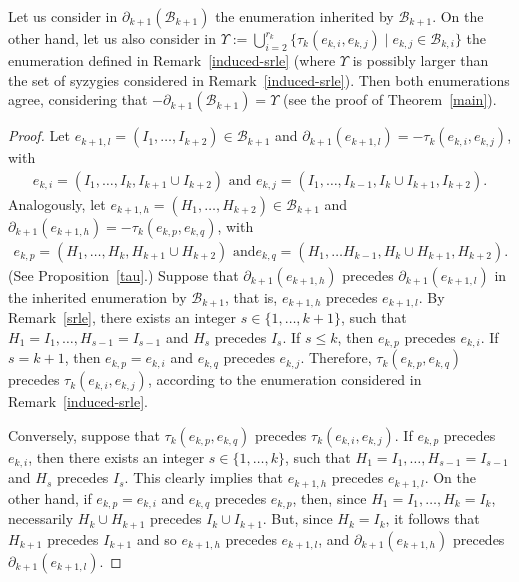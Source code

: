 \documentclass[ALCO]{cedram}
\newcommand{\mcb}{\mbox{$\mathcal{B}$}}
\newcommand{\dif}{\mbox{$\partial$}}
\begin{document}
\begin{remark}\label{enum}
Let us consider in $\dif_{k+1}(\mcb_{k+1})$ the enumeration inherited
by $\mcb_{k+1}$. On the other hand, let us also consider in
$\Upsilon:=\bigcup_{i=2}^{r_k}\{\tau_{k}(e_{k,i},e_{k,j})\mid
e_{k,j}\in\mcb_{k,i}\}$ the enumeration defined in
Remark~\ref{induced-srle} (where $\Upsilon$ is possibly larger than
the set of syzygies considered in Remark~\ref{induced-srle}). Then
both enumerations agree, considering that
$-\dif_{k+1}(\mcb_{k+1})=\Upsilon$ (see the proof of
Theorem~\ref{main}).
\end{remark}
\begin{proof}
Let $e_{k+1,l}=(I_1,\ldots ,I_{k+2})\in\mcb_{k+1}$ and
$\dif_{k+1}(e_{k+1,l})= -\tau_{k}(e_{k,i},e_{k,j})$, with
\begin{eqnarray*}
e_{k,i}=(I_1,\ldots ,I_{k},I_{k+1}\cup I_{k+2})\mbox{ and }
e_{k,j}=(I_1,\ldots ,I_{k-1},I_k\cup I_{k+1},I_{k+2}).
\end{eqnarray*}
Analogously, let $e_{k+1,h}=(H_1,\ldots ,H_{k+2})\in\mcb_{k+1}$ and
$\dif_{k+1}(e_{k+1,h})=-\tau_{k}(e_{k,p},e_{k,q})$, with
\begin{eqnarray*}
e_{k,p}=(H_1,\ldots ,H_k,H_{k+1}\cup H_{k+2})\mbox{ and
}e_{k,q}=(H_1,\ldots H_{k-1},H_k\cup H_{k+1},H_{k+2}).
\end{eqnarray*}
(See Proposition~\ref{tau}.) Suppose that $\dif_{k+1}(e_{k+1,h})$
precedes $\dif_{k+1}(e_{k+1,l})$ in the inherited enumeration by
$\mcb_{k+1}$, that is, $e_{k+1,h}$ precedes $e_{k+1,l}$. By
Remark~\ref{srle}, there exists an integer $s\in\{1,\ldots ,k+1\}$,
such that $H_1=I_1,\ldots ,H_{s-1}=I_{s-1}$ and $H_s$ precedes
$I_s$. If $s\leq k$, then $e_{k,p}$ precedes $e_{k,i}$. If $s=k+1$,
then $e_{k,p}=e_{k,i}$ and $e_{k,q}$ precedes $e_{k,j}$. Therefore,
$\tau_k(e_{k,p},e_{k,q})$ precedes $\tau_k(e_{k,i},e_{k,j})$,
according to the enumeration considered in Remark~\ref{induced-srle}.

Conversely, suppose that $\tau_k(e_{k,p},e_{k,q})$ precedes
$\tau_k(e_{k,i},e_{k,j})$. If $e_{k,p}$ precedes $e_{k,i}$, then there
exists an integer $s\in\{1,\ldots ,k\}$, such that
$H_1=I_1,\ldots,H_{s-1}=I_{s-1}$ and $H_{s}$ precedes $I_{s}$. This
clearly implies that $e_{k+1,h}$ precedes $e_{k+1,l}$. On the other
hand, if $e_{k,p}=e_{k,i}$ and $e_{k,q}$ precedes $e_{k,p}$, then,
since $H_1=I_1,\ldots,H_{k}=I_{k}$, necessarily $H_k\cup H_{k+1}$
precedes $I_k\cup I_{k+1}$. But, since $H_k=I_k$, it follows that
$H_{k+1}$ precedes $I_{k+1}$ and so $e_{k+1,h}$ precedes $e_{k+1,l}$,
and $\dif_{k+1}(e_{k+1,h})$ precedes $\dif_{k+1}(e_{k+1,l})$.
\end{proof}
\end{document}
